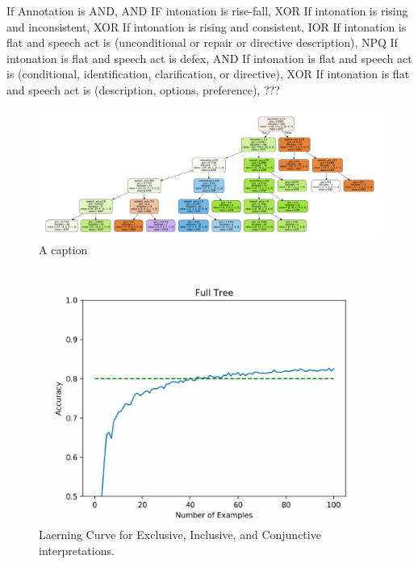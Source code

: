 \documentclass[oneside]{report}
\theoremstyle{definition}
\theoremstyle{definition}
\theoremstyle{definition}
\theoremstyle{remark}
\begin{document}
If Annotation is AND, AND \newline
IF intonation is rise-fall, XOR \newline
If intonation is rising and inconsistent, XOR \newline
If intonation is rising and consistent, IOR \newline
If intonation is flat and speech act is (unconditional or repair or
directive description), NPQ \newline
If intonation is flat and speech act is defex, AND \newline
If intonation is flat and speech act is (conditional, identification,
clarification, or directive), XOR \newline
If intonation is flat and speech act is (description, options,
preference), ??? \newline
\begin{figure}[tb]
\includegraphics[width=0.9\linewidth]{decision_trees/plots/everything} \caption{A caption}\label{fig:everyTree}
\end{figure}
\begin{figure}[tb]

{\centering \includegraphics{figs/everythingLearning-1} 

}

\caption{Laerning Curve for Exclusive, Inclusive, and Conjunctive interpretations.}\label{fig:everythingLearning}
\end{figure}
\end{document}
